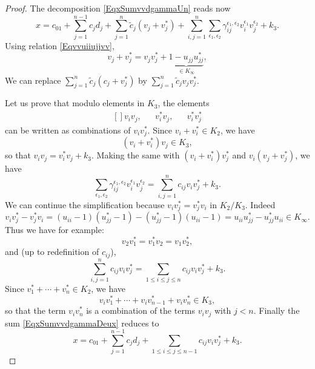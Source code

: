\begin{proof}
    The decomposition \eqref{EqxSumvvdgammaUn} reads now
    \begin{equation}        \label{EqxSumvvdgammaDeux}
        x=c_01+\sum_{j=1}^{n-1}c_jd_j+\sum_{j=1}^n\tilde c_j(v_j+v_j^*)+\sum_{i,j=1}^n\sum_{\epsilon_1,\epsilon_2}\gamma_{ij}^{\epsilon_1,\epsilon_2}v_i^{\epsilon_1}v_j^{\epsilon_2}+k_3.
    \end{equation}
    Using relation \eqref{Eqvvuiiujjvv},
    \begin{equation}
        v_j+v_j^*=v_jv_j^*+\underbrace{1-u_{jj}u_{jj}^*}_{\in K_{\infty}},
    \end{equation}
    We can replace $\sum_{j=1}^n\tilde c_j(c_j+v_j^*)$ by $\sum_{j=1}^n\tilde c_jv_jv_j^*$.

    Let us prove that modulo elements in $K_3$, the elements
    \begin{equation}
        \begin{aligned}[]
            v_iv_j,&&v_i^*v_j,&&v_i^*v_j^*
        \end{aligned}
    \end{equation}
    can be written as combinations of $v_iv_j^*$. Since $v_i+v_i^*\in K_2$, we have
    \begin{equation}
        (v_i+v_i^*)v_j\in K_3,
    \end{equation}
    so that $v_iv_j=v_i^*v_j+k_3$. Making the same with $(v_i+v_i^*)v_j^*$ and $v_i(v_j+v_j^*)$, we have
    \begin{equation}
        \sum_{\epsilon_1,\epsilon_2}\gamma_{ij}^{\epsilon_1,\epsilon_2}v_i^{\epsilon_1}v_j^{\epsilon_2}=\sum_{i,j=1}^nc_{ij}v_iv_j^*+k_3.
    \end{equation}
    We can continue the simplification because $v_iv_j^*=v_j^*v_i$ in $K_2/K_3$. Indeed
    \begin{equation}
        v_iv_j^*-v_j^*v_i=(u_{ii}-1)(u_{jj}^*-1)-(u_{jj}^*-1)(u_{ii}-1)=u_{ii}u_{jj}^*-u_{jj}^*u_{ii}\in K_{\infty}.
    \end{equation}
    Thus we have for example:
    \begin{equation}
        v_2v_1^*=v_1^*v_2=v_1v_2^*,
    \end{equation}
    and (up to redefinition of $c_{ij}$),
    \begin{equation}
        \sum_{i,j=1}^nc_{ij}v_iv_j^*=\sum_{1\leq i\leq j\leq n}c_{ij}v_iv_j^*+k_3.
    \end{equation}
    Since $v^*_1+\cdots+v^*_n\in K_2$, we have
    \begin{equation}
        v_iv_1^*+\cdots+v_iv^*_{n-1}+v_iv^*_n\in K_3,
    \end{equation}
    so that the term $v_iv^*_n$ is a combination of the terms $v_iv_j$ with $j<n$. Finally the sum \eqref{EqxSumvvdgammaDeux} reduces to
    \begin{equation}
        x=c_01+\sum_{j=1}^{n-1}c_jd_j+\sum_{1\leq i\leq j\leq n-1}c_{ij}v_iv_j^*+k_3.
    \end{equation}
\end{proof}




